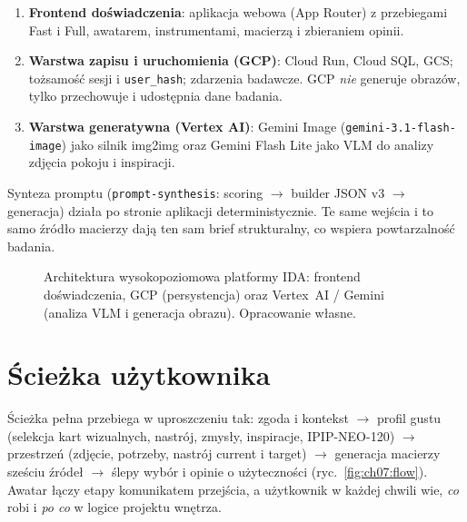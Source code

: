 \begin{enumerate}
  \item \textbf{Frontend doświadczenia}: aplikacja webowa (App Router) z przebiegami Fast i Full, awatarem, instrumentami, macierzą i zbieraniem opinii.
  \item \textbf{Warstwa zapisu i uruchomienia (GCP)}: Cloud Run, Cloud SQL, GCS; tożsamość sesji i \texttt{user\_hash}; zdarzenia badawcze. GCP \emph{nie} generuje obrazów, tylko przechowuje i udostępnia dane badania.
  \item \textbf{Warstwa generatywna (Vertex AI)}: Gemini Image (\texttt{gemini-3.1-flash-image}) jako silnik img2img oraz Gemini Flash Lite jako VLM do analizy zdjęcia pokoju i inspiracji.
\end{enumerate}

Synteza promptu (\texttt{prompt-synthesis}: scoring $\rightarrow$ builder JSON v3 $\rightarrow$ generacja) działa po stronie aplikacji deterministycznie. Te same wejścia i to samo źródło macierzy dają ten sam brief strukturalny, co wspiera powtarzalność badania.

\begin{figure}[htbp]
  \centering
  \caption{Architektura wysokopoziomowa platformy IDA: frontend doświadczenia, GCP (persystencja) oraz Vertex~AI / Gemini (analiza VLM i generacja obrazu). Opracowanie własne.}
  \label{fig:ch07:architecture}
\end{figure}

\section{Ścieżka użytkownika}
\label{ch07:sec:flow}

Ścieżka pełna przebiega w uproszczeniu tak: zgoda i kontekst $\rightarrow$ profil gustu (selekcja kart wizualnych, nastrój, zmysły, inspiracje, IPIP-NEO-120) $\rightarrow$ przestrzeń (zdjęcie, potrzeby, nastrój current i target) $\rightarrow$ generacja macierzy sześciu źródeł $\rightarrow$ ślepy wybór i opinie o użyteczności (ryc.~\ref{fig:ch07:flow}). Awatar łączy etapy komunikatem przejścia, a użytkownik w każdej chwili wie, \emph{co} robi i \emph{po co} w logice projektu wnętrza.

